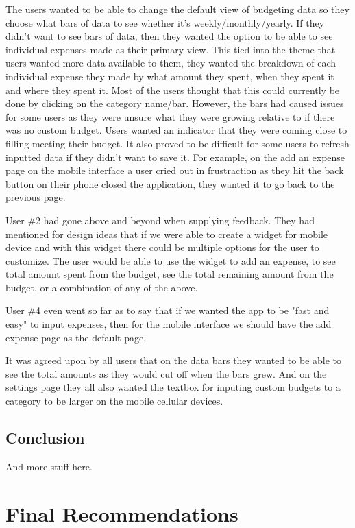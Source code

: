 \documentclass{chi2011}
\begin{document}
	The users wanted to be able to change the default view of budgeting data so they choose
	what bars of data to see whether it's weekly/monthly/yearly. If they didn't want to see bars of
	data, then they wanted the option to be able to see individual expenses made as their primary 
	view. This tied into the theme that users wanted more data available to them, they wanted the
	breakdown of each individual expense they made by what amount they spent, when they spent it 
	and where they spent it. Most of the users thought that this could currently be done by 
	clicking on the category name/bar. However, the bars had caused issues for some users as they 
	were unsure what they were growing relative to if there was no custom budget. Users wanted an 
	indicator that they were coming close to filling meeting their budget. It also proved to be 
	difficult for some users to refresh inputted data if they didn't want to save it. For example,
	on the add an expense page on the mobile interface a user cried out in frustraction as they hit
	the back button on their phone closed the application, they wanted it to go back to the 
	previous page. 
	
	User \#2 had gone above and beyond when supplying feedback. They had mentioned for 
	design ideas that if we were able to create a widget for mobile device and with this widget
	there could be multiple options for the user to customize. The user would be able to use the 
	widget to add an expense, to see total amount spent from the budget, see the total remaining 
	amount from the budget, or a combination of any of the above. 
	
	User \#4 even went so far as to say that if we wanted the app to be "fast and easy" to input
	expenses, then for the mobile interface we should have the add expense page as the default
	page. 
	
	It was agreed upon by all users that on the data bars they wanted to be able to see the total
	amounts as they would cut off when the bars grew. And on the settings page they all also wanted
	the textbox for inputing custom budgets to a category to be larger on the mobile cellular 
	devices.

	\subsection{Conclusion}

	And more stuff here.

\section{Final Recommendations}
\end{document}
